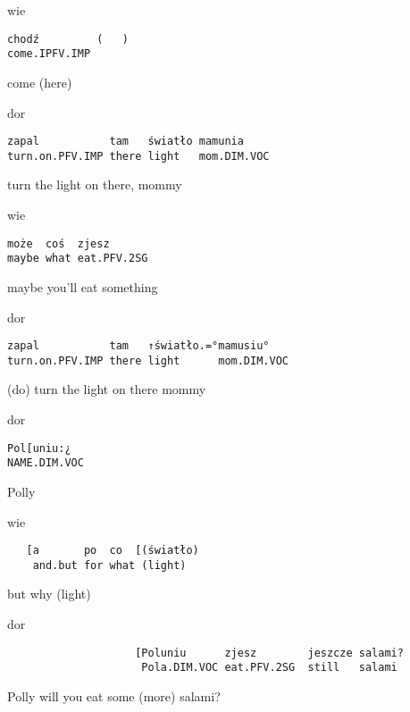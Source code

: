 \documentclass[output=paper]{langsci/langscibook}
\begin{document}
\vspace{2mm}
%
\begin{transbox}{1}{wie}
\begin{verbatim}
chodź         (   )
come.IPFV.IMP
\end{verbatim}
come (here)
\end{transbox}
%
\begin{mdframednoverticalspace}[style=firstfoc]
\begin{transbox}{2}{dor}
\begin{verbatim}
zapal           tam   światło mamunia
turn.on.PFV.IMP there light   mom.DIM.VOC
\end{verbatim}
turn the light on there, mommy
\end{transbox}
\end{mdframednoverticalspace}
%
\begin{transbox}{3}{wie}
\begin{verbatim}
może  coś  zjesz
maybe what eat.PFV.2SG
\end{verbatim}
maybe you’ll eat something
\end{transbox}
%
%
\begin{mdframednoverticalspace}[style=firstfoc]
\begin{transbox}{5}{dor}
\begin{verbatim}
zapal           tam   ↑światło.=°mamusiu°
turn.on.PFV.IMP there light      mom.DIM.VOC
\end{verbatim}
(do) turn the light on there mommy
\end{transbox}
\end{mdframednoverticalspace}
%
%
\begin{mdframednoverticalspace}[style=firstfoc]
\begin{transbox}{7}{dor}
\begin{verbatim}
Pol[uniu:¿
NAME.DIM.VOC
\end{verbatim}
Polly
\end{transbox}
\end{mdframednoverticalspace}
%
\begin{mdframednoverticalspace}[style=secondfoc]
\begin{transbox}{8}{wie}
\begin{verbatim}
   [a       po  co  [(światło)
    and.but for what (light)
\end{verbatim}
\hspace{0.5cm} but why (light)
\end{transbox}
\end{mdframednoverticalspace}
%
\begin{transbox}{9}{dor}
\begin{verbatim}
                    [Poluniu      zjesz        jeszcze salami?
                     Pola.DIM.VOC eat.PFV.2SG  still   salami
\end{verbatim}
\hspace{3cm} Polly will you eat some (more) salami?
\end{transbox}\bigskip
\end{document}
